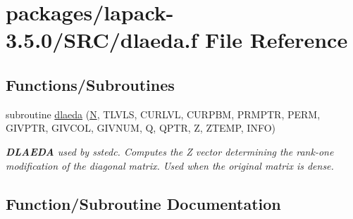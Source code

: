 \hypertarget{dlaeda_8f}{}\section{packages/lapack-\/3.5.0/\+S\+R\+C/dlaeda.f File Reference}
\label{dlaeda_8f}
\subsection*{Functions/\+Subroutines}
\begin{DoxyCompactItemize}
\item 
subroutine \hyperlink{dlaeda_8f_a2e9c705677688bcd3e804db194dfcfd7}{dlaeda} (\hyperlink{polmisc_8c_a0240ac851181b84ac374872dc5434ee4}{N}, T\+L\+V\+L\+S, C\+U\+R\+L\+V\+L, C\+U\+R\+P\+B\+M, P\+R\+M\+P\+T\+R, P\+E\+R\+M, G\+I\+V\+P\+T\+R, G\+I\+V\+C\+O\+L, G\+I\+V\+N\+U\+M, Q, Q\+P\+T\+R, Z, Z\+T\+E\+M\+P, I\+N\+F\+O)
\begin{DoxyCompactList}\small\item\em {\bfseries D\+L\+A\+E\+D\+A} used by sstedc. Computes the Z vector determining the rank-\/one modification of the diagonal matrix. Used when the original matrix is dense. \end{DoxyCompactList}\end{DoxyCompactItemize}


\subsection{Function/\+Subroutine Documentation}
\hypertarget{dlaeda_8f_a2e9c705677688bcd3e804db194dfcfd7}{}
